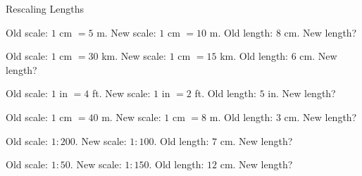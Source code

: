 \begin{practiceBox}{Rescaling Lengths}


\prob Old scale: $1$ cm $= 5$ m. New scale: $1$ cm $= 10$ m. Old length: $8$ cm. New length? \answerBlank[3cm]

\prob Old scale: $1$ cm $= 30$ km. New scale: $1$ cm $= 15$ km. Old length: $6$ cm. New length? \answerBlank[3cm]

\prob Old scale: $1$ in $= 4$ ft. New scale: $1$ in $= 2$ ft. Old length: $5$ in. New length? \answerBlank[3cm]

\prob Old scale: $1$ cm $= 40$ m. New scale: $1$ cm $= 8$ m. Old length: $3$ cm. New length? \answerBlank[3cm]

\prob Old scale: $1:200$. New scale: $1:100$. Old length: $7$ cm. New length? \answerBlank[3cm]

\prob Old scale: $1:50$. New scale: $1:150$. Old length: $12$ cm. New length? \answerBlank[3cm]
\end{practiceBox}

